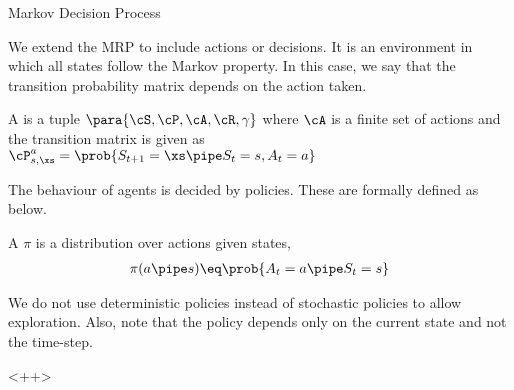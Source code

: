 \documentclass{article}
\begin{document}
\begin{ssection}{Markov Decision Process}

	We extend the MRP to include actions or decisions. It is an environment in which all states follow the Markov property. In this case, we say that the transition probability matrix depends on the action taken.

	\begin{definition}
		A  is a tuple $\para{\cS, \cP, \cA, \cR, \gamma}$ where $\cA$ is a finite set of actions and the transition matrix is given as $\cP^{a}_{s, \xs} = \prob{S_{t + 1} = \xs \pipe S_t = s, A_t = a}$
		\label{def:markov-decision-process}
	\end{definition}

	The behaviour of agents is decided by policies. These are formally defined as below.
	\begin{definition}[Policy]
		A  $\pi$ is a distribution over actions given states,
		\begin{align*}
			\pi(a \pipe s) \eq \prob{A_t = a \pipe S_t = s}
		\end{align*}
		\label{def:policy}
	\end{definition}

	We do not use deterministic policies instead of stochastic policies to allow exploration. Also, note that the policy depends only on the current state and not the time-step.

\end{ssection}<++>
\end{document}

